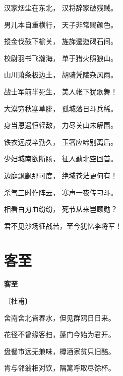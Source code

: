 \documentclass[12pt,UTF-8,openany,fontset=none]{ctexbook}
\begin{document}
    \vspace{18pt}  %

\begin{center}
    \begin{Large}

        汉家烟尘在东北， 汉将辞家破残贼。

        男儿本自重横行， 天子非常赐颜色。

        摐金伐鼓下榆关， 旌旆逶迤碣石间。

        校尉羽书飞瀚海， 单于猎火照狼山。

        山川萧条极边土， 胡骑凭陵杂风雨。

        战士军前半死生， 美人帐下犹歌舞！

        大漠穷秋塞草腓， 孤城落日斗兵稀。

        身当恩遇恒轻敌， 力尽关山未解围。

        铁衣远戍辛勤久， 玉箸应啼别离后。

        少妇城南欲断肠， 征人蓟北空回首。

        边庭飘飖那可度， 绝域苍茫更何有！

        杀气三时作阵云， 寒声一夜传刁斗。

        相看白刃血纷纷， 死节从来岂顾勋？

        君不见沙场征战苦，至今犹忆李将军！

    \end{Large}

\end{center}

\vspace{8pt}
\clearpage

\section{客至}


\begin{center}
    {\bfseries 客至}

    \vspace{18pt}

    \begin{large}\xuwen
        〔杜甫〕
    \end{large}

\end{center}

    \vspace{18pt}  %

\begin{center}
    \begin{Large}

        舍南舍北皆春水，但见群鸥日日来。

        花径不曾缘客扫，蓬门今始为君开。

        盘餐市远无兼味，樽酒家贫只旧醅。

        肯与邻翁相对饮，隔篱呼取尽馀杯。

    \end{Large}

\end{center}
\end{document}
